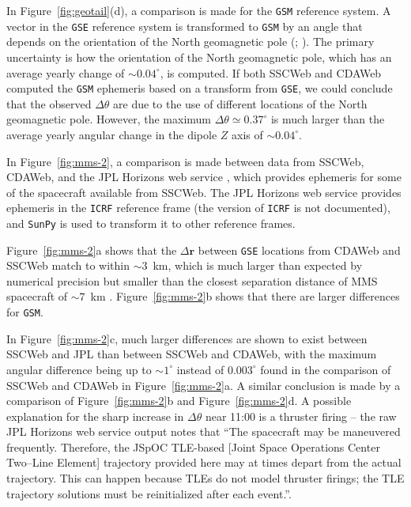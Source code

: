 \documentclass[draft]{agujournal2019}
\begin{document}
In Figure~\ref{fig:geotail}(d), a comparison is made for the \texttt{GSM} reference system. A vector in the \texttt{GSE} reference system is transformed to \texttt{GSM} by an angle that depends on the orientation of the North geomagnetic pole (; ). The primary uncertainty is how the orientation of the North geomagnetic pole, which has an average yearly change of ${\sim}0.04^\circ$, is computed. If both SSCWeb and CDAWeb computed the \texttt{GSM} ephemeris based on a transform from \texttt{GSE}, we could conclude that the observed $\Delta \theta$ are due to the use of different locations of the North geomagnetic pole. However, the maximum $\Delta \theta \simeq 0.37^\circ$ is much larger than the average yearly angular change in the dipole $Z$ axis of ${\sim}0.04^\circ$.




In Figure~\ref{fig:mms-2}, a comparison is made between data from SSCWeb, CDAWeb, and the JPL Horizons web service \cite{JPLHorizons}, which provides ephemeris for some of the spacecraft available from SSCWeb. The JPL Horizons web service provides ephemeris in the \texttt{ICRF} reference frame (the version of \texttt{ICRF} is not documented), and \texttt{SunPy} is used to transform it to other reference frames.

Figure~\ref{fig:mms-2}a shows that the $\Delta \mathbf{r}$ between \texttt{GSE} locations from CDAWeb and SSCWeb match to within ${\sim}3$~km, which is much larger than expected by numerical precision but smaller than the closest separation distance of MMS spacecraft of ${\sim}7$~km \cite{NASA2016}. Figure~\ref{fig:mms-2}b shows that there are larger differences for \texttt{GSM}.

In Figure~\ref{fig:mms-2}c, much larger differences are shown to exist between SSCWeb and JPL than between SSCWeb and CDAWeb, with the maximum angular difference being up to ${\sim}1^\circ$ instead of $0.003^\circ$ found in the comparison of SSCWeb and CDAWeb in Figure~\ref{fig:mms-2}a. A similar conclusion is made by a comparison of Figure~\ref{fig:mms-2}b and Figure~\ref{fig:mms-2}d. A possible explanation for the sharp increase in $\Delta \theta$ near 11:00 is a thruster firing -- the raw JPL Horizons web service output notes that ``The spacecraft may be maneuvered frequently. Therefore, the JSpOC TLE-based [Joint Space Operations Center Two--Line Element] trajectory provided here may at times depart from the actual trajectory. This can happen because TLEs do not model thruster firings; the TLE trajectory solutions must be reinitialized after each event.''.
\end{document}
